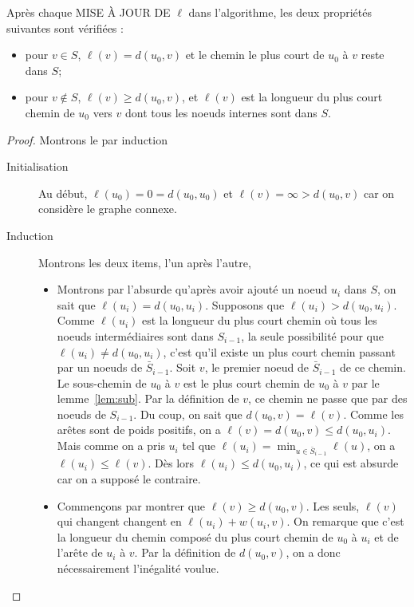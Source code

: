 \begin{mytheo} 
  Après chaque MISE À JOUR DE $\ell$ dans l'algorithme, les deux propriétés suivantes sont vérifiées :
  \begin{itemize}
    \item pour $v \in S$, $\ell(v) = d(u_0, v)$ et le chemin le plus court de $u_0$ à $v$ reste dans $S$;
    \item pour $v \notin S$, $\ell(v) \geq d(u_0, v)$, et $\ell(v)$ est la longueur du plus court chemin de $u_0$ vers $v$ dont tous les noeuds internes sont dans $S$.
  \end{itemize}
  \begin{proof}
    Montrons le par induction
    \begin{description}
      \item[Initialisation]
        Au début, $\ell(u_0) = 0 = d(u_0, u_0)$ et $\ell(v) = \infty > d(u_0, v)$
        car on considère le graphe connexe.
      \item[Induction]
        Montrons les deux items, l'un après l'autre,
        \begin{itemize}
          \item
            Montrons par l'absurde qu'après avoir ajouté un noeud $u_i$ dans $S$, on sait que $\ell(u_i) = d(u_0, u_i)$.
            Supposons que $\ell(u_i) > d(u_0, u_i)$.
            Comme $\ell(u_i)$ est la longueur du plus court chemin où tous les
            noeuds intermédiaires sont dans $S_{i-1}$,
            la seule possibilité pour que $\ell(u_i) \neq d(u_0, u_i)$,
            c'est qu'il existe un plus court chemin passant par un noeuds de $\bar{S}_{i-1}$.
            Soit $v$, le premier noeud de $\bar{S}_{i-1}$ de ce chemin.
            Le sous-chemin de $u_0$ à $v$ est le plus court chemin de $u_0$ à $v$ par
            le lemme~\ref{lem:sub}.
            Par la définition de $v$, ce chemin ne passe que par des noeuds de
            $S_{i-1}$.
            Du coup, on sait que $d(u_0, v) = \ell(v)$.
            Comme les arêtes sont de poids positifs, on a $\ell(v) = d(u_0, v) \leq d(u_0, u_i)$.
            Mais comme on a pris $u_i$ tel que $\ell(u_i) = \min_{u \in \bar{S}_{i-1}} \ell(u)$,
            on a $\ell(u_i) \leq \ell(v)$.
            Dès lors $\ell(u_i) \leq d(u_0, u_i)$, ce qui est absurde car on a supposé le contraire.
          \item
            Commençons par montrer que $\ell(v) \geq d(u_0, v)$.
            Les seuls, $\ell(v)$ qui changent changent en $\ell(u_i) + w(u_i, v)$.
            On remarque que c'est la longueur du chemin composé du plus court
            chemin de $u_0$ à $u_i$ et de l'arête de $u_i$ à $v$.
            Par la définition de $d(u_0, v)$, on a donc nécessairement l'inégalité voulue.


\end{itemize}
\end{description}
\end{proof}
\end{mytheo}
